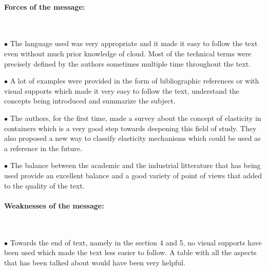 \documentclass[11pt]{article}
\begin{document}
\paragraph{Forces of the message:}
~\newline
~\newline
\begin{minipage}[t]{1\textwidth}
    \begin{description}
        \item $\bullet$ The language used was very appropriate and it made it easy to follow the text even without much prior knowledge of cloud. Most of the technical terms were precisely defined by the authors sometimes multiple time throughout the text.
        \item $\bullet$ A lot of examples were provided in the form of bibliographic references or with visual supports which made it very easy to follow the text, understand the concepts being introduced and summarize the subject.
        \item $\bullet$ The authors, for the first time, made a survey about the concept of elasticity in containers which is a very good step towards deepening this field of study. They also proposed a new way to classify elasticity mechanisms which could be used as a reference in the future.
        \item $\bullet$ The balance between the academic and the industrial litterature that has being used provide an excellent balance and a good variety of point of views that added to the quality of the text.
    \end{description}
\end{minipage}

\paragraph{Weaknesses of the message:}
~\newline
~\newline
\begin{minipage}[t]{1\textwidth}
    \begin{description}
        \item $\bullet$ Towards the end of text, namely in the section 4 and 5, no visual supports have been used which made the text less easier to follow. A table with all the aspects that has been talked about would have been very helpful.
    \end{description}
\end{minipage}
\end{document}
